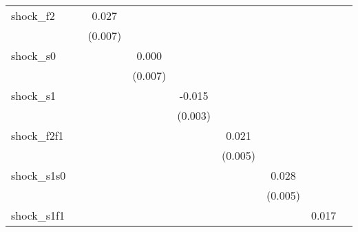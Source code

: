 {\begin{tabular}{l*{8}{c}}
\addlinespace
shock\_f2    &                     &       0.027\sym{***}&                     &                     &                     &                     &                     &                     \\
            &                     &     (0.007)         &                     &                     &                     &                     &                     &                     \\
\addlinespace
shock\_s0    &                     &                     &       0.000         &                     &                     &                     &                     &                     \\
            &                     &                     &     (0.007)         &                     &                     &                     &                     &                     \\
\addlinespace
shock\_s1    &                     &                     &                     &      -0.015\sym{***}&                     &                     &                     &                     \\
            &                     &                     &                     &     (0.003)         &                     &                     &                     &                     \\
\addlinespace
shock\_f2f1  &                     &                     &                     &                     &       0.021\sym{***}&                     &                     &                     \\
            &                     &                     &                     &                     &     (0.005)         &                     &                     &                     \\
\addlinespace
shock\_s1s0  &                     &                     &                     &                     &                     &       0.028\sym{***}&                     &                     \\
            &                     &                     &                     &                     &                     &     (0.005)         &                     &                     \\
\addlinespace
shock\_s1f1  &                     &                     &                     &                     &                     &                     &       0.017\sym{**} &                     \\

\end{tabular}}
